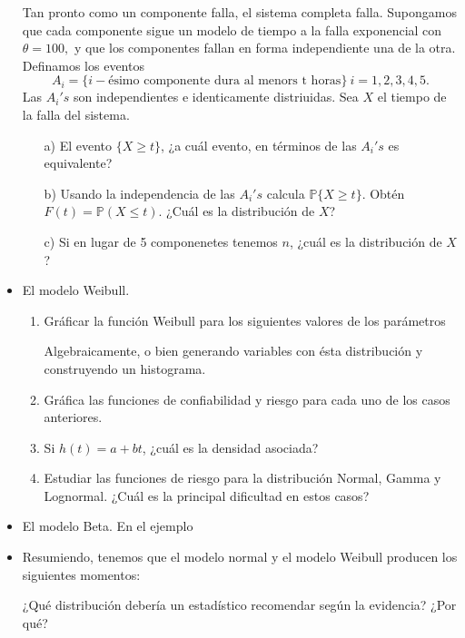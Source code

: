 \documentclass[11pt,letterpaper]{article}
\newcommand{\mP}{\mathbb{P}}
\begin{document}
\begin{itemize}
Tan pronto como un componente falla, el sistema completa falla. Supongamos que cada componente sigue un modelo de tiempo a la falla exponencial con $\theta=100,$ y que los componentes fallan en forma independiente una de la otra. Definamos los eventos
$$A_i=\{i-\text{ésimo componente dura al menors t horas}\}\ i=1,2,3,4,5. $$
Las $A_i's$ son independientes e identicamente distriuidas. Sea $X$ el tiempo de la falla del sistema.
\begin{itemize}
\item[a)] El evento $\{ X\geq t\}$, ¿a cuál evento, en términos de las $A_i's$ es equivalente?
\item[b)] Usando la independencia de las $A_i's$ calcula $\mP\{ X\geq t\}$. Obtén $F(t)=\mP(X\leq t).$ ¿Cuál es la distribución de $X$?
\item[c)] Si en lugar de 5 componenetes tenemos $n$, ¿cuál es la distribución de $X$?
\end{itemize}

\item El modelo Weibull. 
\begin{enumerate}
\item Gráficar la función Weibull para los siguientes valores de los parámetros 

Algebraicamente, o bien generando variables con ésta distribución y construyendo un histograma.


\item Gráfica las funciones de confiabilidad y riesgo para cada uno de los casos anteriores.

\item Si $h(t)= a+bt$, ¿cuál es la densidad asociada?

\item Estudiar las funciones de riesgo para la distribución Normal, Gamma y Lognormal. ¿Cuál es la principal dificultad en estos casos?
\end{enumerate}
\item El modelo Beta. En el ejemplo 


\item Resumiendo, tenemos que el modelo normal y el modelo Weibull producen los siguientes momentos: 

¿Qué distribución debería un estadístico recomendar según la evidencia? ¿Por qué?
\end{itemize}
\end{document}
